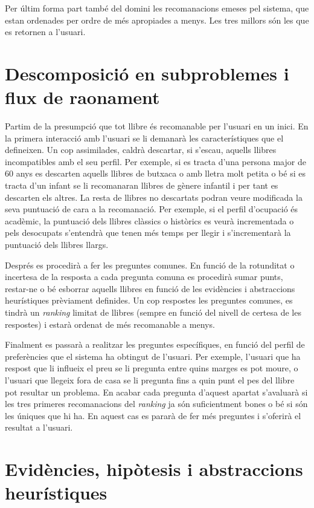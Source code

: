 Per últim forma part també del domini les recomanacions emeses pel sistema, que estan ordenades per ordre de més apropiades a menys. Les tres millors són les que es retornen a l'usuari.

\section{Descomposició en subproblemes i flux de raonament}

Partim de la presumpció que tot llibre és recomanable per l'usuari en un inici. En la primera interacció amb l'usuari se li demanarà les característiques que el defineixen. Un cop assimilades, caldrà descartar, si s'escau, aquells llibres incompatibles amb el seu perfil. Per exemple, si es tracta d'una persona major de 60 anys es descarten aquells llibres de butxaca o amb lletra molt petita o bé si es tracta d'un infant se li recomanaran llibres de gènere infantil i per tant es descarten els altres. La resta de llibres no descartats podran veure modificada la seva puntuació de cara a la recomanació. Per exemple, si el perfil d'ocupació és acadèmic, la puntuació dels llibres clàssics o històrics es veurà incrementada o pels desocupats s'entendrà que tenen més temps per llegir i s'incrementarà la puntuació dels llibres llargs. 

Després es procedirà a fer les preguntes comunes. En funció de la rotunditat o incertesa de la resposta a cada pregunta comuna es procedirà sumar punts, restar-ne o bé esborrar aquells llibres en funció de les evidències i abstraccions heurístiques prèviament definides. Un cop respostes les preguntes comunes, es tindrà un \emph{ranking} limitat de llibres (sempre en funció del nivell de certesa de les respostes) i estarà ordenat de més recomanable a menys.

Finalment es passarà a realitzar les preguntes específiques, en funció del perfil de preferències que el sistema ha obtingut de l'usuari. Per exemple, l'usuari que ha respost que li influeix el preu se li pregunta entre quins marges es pot moure, o l'usuari que llegeix fora de casa se li pregunta fins a quin punt el pes del llibre pot resultar un problema. En acabar cada pregunta d'aquest apartat s'avaluarà si les tres primeres recomanacions del \emph{ranking} ja són suficientment bones o bé si són les úniques que hi ha. En aquest cas es pararà de fer més preguntes i s'oferirà el resultat a l'usuari.

\section{Evidències, hipòtesis i abstraccions heurístiques}

